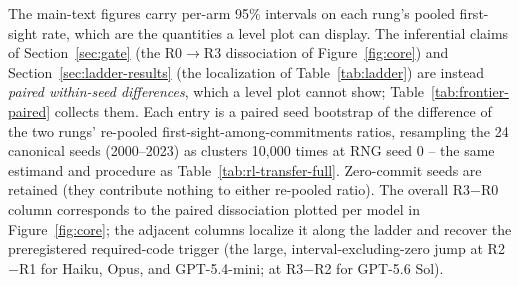 \documentclass{article}
\begin{document}
The main-text figures carry per-arm 95\% intervals on each rung's pooled first-sight rate, which are the quantities a level plot can display. The inferential claims of Section~\ref{sec:gate} (the R0$\to$R3 dissociation of Figure~\ref{fig:core}) and Section~\ref{sec:ladder-results} (the localization of Table~\ref{tab:ladder}) are instead \emph{paired within-seed differences}, which a level plot cannot show; Table~\ref{tab:frontier-paired} collects them. Each entry is a paired seed bootstrap of the difference of the two rungs' re-pooled first-sight-among-commitments ratios, resampling the 24 canonical seeds (2000--2023) as clusters 10,000 times at RNG seed 0 -- the same estimand and procedure as Table~\ref{tab:rl-transfer-full}. Zero-commit seeds are retained (they contribute nothing to either re-pooled ratio). The overall R3$-$R0 column corresponds to the paired dissociation plotted per model in Figure~\ref{fig:core}; the adjacent columns localize it along the ladder and recover the preregistered required-code trigger (the large, interval-excluding-zero jump at R2$-$R1 for Haiku, Opus, and GPT-5.4-mini; at R3$-$R2 for GPT-5.6 Sol).

\begin{table}[H]
\centering \caption{\textbf{Paired within-seed first-sight commitment differences for each frontier model}, in percentage points with 95\% seed-bootstrap intervals ($N=24$, 10,000 resamples, RNG seed 0; difference of re-pooled among-commitment ratios, matching Table~\ref{tab:rl-transfer-full}). Adjacent-rung columns localize the shift; the final column is the overall R0$\to$R3 dissociation of Figure~\ref{fig:core}. Positive means more first-sight (eager) commitment at the later rung.} \label{tab:frontier-paired} \small {}
\end{table}
\end{document}

